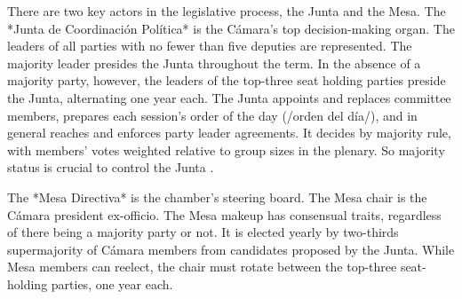\documentclass[letter,12pt]{article}
\begin{document}


There are two key actors in the legislative process, the Junta and the Mesa. The *Junta de Coordinación Política* is the Cámara's top decision-making organ. The leaders of all parties with no fewer than five deputies are represented. The majority leader presides the Junta throughout the term. In the absence of a majority party, however, the leaders of the top-three seat holding parties preside the Junta, alternating one year each. The Junta appoints and replaces committee members, prepares each session's order of the day (/orden del día/), and in general reaches and enforces party leader agreements. It decides by majority rule, with members' votes weighted relative to group sizes in the plenary. So majority status is crucial to control the Junta \citep[cf.][]{cox.mccubbins.2005}.



The *Mesa Directiva* is the chamber's steering board. The Mesa chair is the Cámara president ex-officio. The Mesa makeup has consensual traits, regardless of there being a majority party or not. It is elected yearly by two-thirds supermajority of Cámara members from candidates proposed by the Junta. While Mesa members can reelect, the chair must rotate between the top-three seat-holding parties, one year each. 

\end{document}
